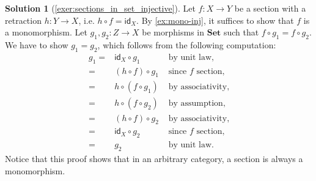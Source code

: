 \documentclass[a4paper,11pt, oneside,titlepage=false]{scrbook}
\theoremstyle{plain}
\theoremstyle{definition}
\newtheorem{solution}[thm]{Solution}
\newcommand{\cfont}[1]{\ensuremath{\mathsf{#1}}}
\newcommand{\Catb}[1]{\mathbf{#1}}
\newcommand{\SET}{\Catb{Set}}
\newcommand{\Id}[1][]{\cfont{id}_{#1}}
\newcommand{\co}[2]{\ensuremath{#2 \circ #1}}
\begin{document}
\begin{solution}[\cref{exer:sections_in_set_injective}]\label{sol:sections_in_set_injective}
Let $f:X\to Y$ be a section with a retraction $h:Y\to X$, i.e. $\co{f}{h} = \Id[X]$. By \cref{ex:mono-inj}, it suffices to show that $f$ is a monomorphism. Let  $g_1, g_2 : Z \to X$ be morphisms in $\SET$ such that $\co{g_1}{f} = \co{g_2}{f}$. We have to show $g_1=g_2$, which follows from the following computation:
\begin{eqnarray*}
g_1 =& \co{g_1}{\Id[X]} & \text{ by unit law},\\
	=& \co{g_1}{(\co{f}{h})} & \text{ since $f$ section},\\
	=& \co{(\co{g_1}{f})}{h} & \text{ by associativity},\\
	=&  \co{(\co{g_2}{f})}{h} & \text{ by assumption},\\
	=& \co{g_2}{(\co{f}{h})} & \text{ by associativity},\\
	=& \co{g_2}{\Id[X]} & \text{ since $f$ section},\\
	=& g_2 & \text{ by unit law}.
\end{eqnarray*}
Notice that this proof shows that in an arbitrary category, a section is always a monomorphism.
\end{solution}
\end{document}

